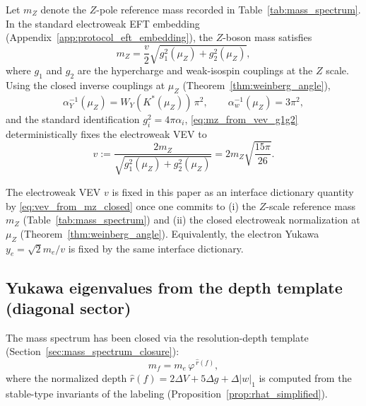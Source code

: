 \begin{proposition}\label{prop:vev_from_mz_closed_ew}
\MatchTag Let $m_Z$ denote the $Z$-pole reference mass recorded in Table~\ref{tab:mass_spectrum}.
\InterfaceTag In the standard electroweak EFT embedding (Appendix~\ref{app:protocol_eft_embedding}), the $Z$-boson mass satisfies
\begin{equation}\label{eq:mz_from_vev_g1g2}
m_Z=\frac{v}{2}\sqrt{g_1^2(\mu_Z)+g_2^2(\mu_Z)},
\end{equation}
where $g_1$ and $g_2$ are the hypercharge and weak-isospin couplings at the $Z$ scale.
Using the closed inverse couplings at $\mu_Z$ (Theorem~\ref{thm:weinberg_angle}),
\begin{equation}\label{eq:ew_inverse_alphas_recap}
\alpha_Y^{-1}(\mu_Z)=W_Y(K^\ast(\mu_Z))\,\pi^2,\qquad \alpha_w^{-1}(\mu_Z)=3\pi^2,
\end{equation}
and the standard identification $g_i^2=4\pi\alpha_i$, \eqref{eq:mz_from_vev_g1g2} deterministically fixes the electroweak VEV to
\begin{equation}\label{eq:vev_from_mz_closed}
v:=\frac{2m_Z}{\sqrt{g_1^2(\mu_Z)+g_2^2(\mu_Z)}}=2m_Z\sqrt{\frac{15\pi}{26}}.
\end{equation}
\end{proposition}

\begin{remark}\label{rem:vev_interface_status}
The electroweak VEV $v$ is fixed in this paper as an interface dictionary quantity by \eqref{eq:vev_from_mz_closed} once one commits to (i) the $Z$-scale reference mass $m_Z$ (Table~\ref{tab:mass_spectrum}) and (ii) the closed electroweak normalization at $\mu_Z$ (Theorem~\ref{thm:weinberg_angle}).
Equivalently, the electron Yukawa $y_e=\sqrt{2}m_e/v$ is fixed by the same interface dictionary.
\end{remark}

\subsection{Yukawa eigenvalues from the depth template (diagonal sector)}
\label{subsec:yukawa_eigenvalues_closure}

The mass spectrum has been closed via the resolution-depth template (Section~\ref{sec:mass_spectrum_closure}):
\begin{equation}\label{eq:mass_from_depth_recap}
m_f = m_e\,\varphi^{\,\widehat r(f)},
\end{equation}
where the normalized depth $\widehat r(f)=2\Delta V+5\Delta g+\Delta|w|_1$ is computed from the stable-type invariants of the labeling (Proposition~\ref{prop:rhat_simplified}).

